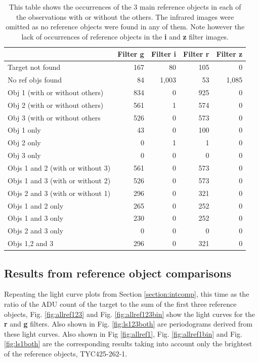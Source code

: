 \begin{table}[!htbp]
\begin{center}
\begin{tabular}{lrrrr}
&Filter g&Filter i&Filter r&Filter z\\\hline
Target not found&167&80&105&0\\
No ref objs found & 84 & 1,003 & 53 & 1,085 \\\hline
Obj 1 (with or without others) & 834 & 0 & 925 & 0 \\
Obj 2 (with or without others) & 561 & 1 & 574 & 0 \\
Obj 3 (with or without others& 526 & 0 & 573 & 0 \\
Obj 1 only & 43 & 0 & 100 & 0 \\
Obj 2 only & 0 & 1 & 1 & 0 \\
Obj 3 only & 0 & 0 & 0 & 0 \\
Objs 1 and 2 (with or without 3) & 561 & 0 & 573 & 0 \\
Objs 1 and 3 (with or without 2) & 526 & 0 & 573 & 0 \\
Objs 2 and 3 (with or without 1) & 296 & 0 & 321 & 0 \\
Objs 1 and 2 only & 265 & 0 & 252 & 0 \\
Objs 1 and 3 only & 230 & 0 & 252 & 0 \\
Objs 2 and 3 only & 0 & 0 & 0 & 0 \\
Objs 1,2 and 3 & 296 & 0 & 321 & 0 \\
\hline
\end{tabular}
\end{center}
\caption{This table shows the occurrences of the 3 main reference objects in each of the observations with or without
  the others. The infrared images were omitted as no reference objects were found in any of them. Note however the lack
  of occurrences of reference objects in the \textbf{i} and \textbf{z} filter images.}
\protect\label{table:occtb}
\end{table}

\subsection{Results from reference object comparisons}
\protect\label{section:refobjres}

Repeating the light curve plots from Section \ref{section:intcomp}, this time as the ratio of the ADU count of the
target to the sum of the first three reference objects, Fig.  \ref{fig:allref123} and Fig. \ref{fig:allref123bin} show
the light curves for the \textbf{r} and \textbf{g} filters. Also shown in Fig. \ref{fig:ls123both} are periodograms
derived from these light curves. Also shown in Fig \ref{fig:allref1}, Fig. \ref{fig:allref1bin} and Fig. \ref{fig:ls1both}
are the corresponding results taking into account only the brightest of the reference objects, TYC425-262-1.


